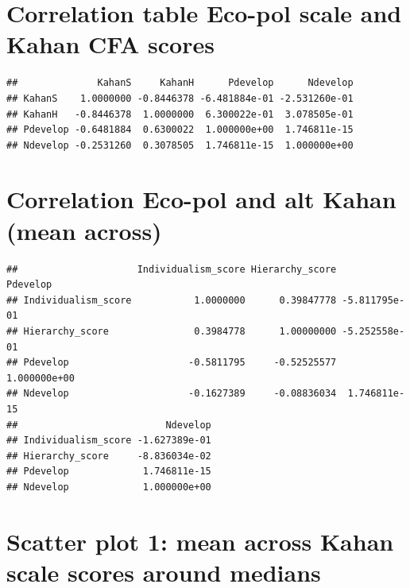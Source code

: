 \documentclass[
]{article}
\begin{document}
\newpage

\hypertarget{correlation-table-eco-pol-scale-and-kahan-cfa-scores}{%
\section{Correlation table Eco-pol scale and Kahan CFA
scores}\label{correlation-table-eco-pol-scale-and-kahan-cfa-scores}}

\begin{verbatim}
##              KahanS     KahanH      Pdevelop      Ndevelop
## KahanS    1.0000000 -0.8446378 -6.481884e-01 -2.531260e-01
## KahanH   -0.8446378  1.0000000  6.300022e-01  3.078505e-01
## Pdevelop -0.6481884  0.6300022  1.000000e+00  1.746811e-15
## Ndevelop -0.2531260  0.3078505  1.746811e-15  1.000000e+00
\end{verbatim}

\hypertarget{correlation-eco-pol-and-alt-kahan-mean-across}{%
\section{Correlation Eco-pol and alt Kahan (mean
across)}\label{correlation-eco-pol-and-alt-kahan-mean-across}}

\begin{verbatim}
##                     Individualism_score Hierarchy_score      Pdevelop
## Individualism_score           1.0000000      0.39847778 -5.811795e-01
## Hierarchy_score               0.3984778      1.00000000 -5.252558e-01
## Pdevelop                     -0.5811795     -0.52525577  1.000000e+00
## Ndevelop                     -0.1627389     -0.08836034  1.746811e-15
##                          Ndevelop
## Individualism_score -1.627389e-01
## Hierarchy_score     -8.836034e-02
## Pdevelop             1.746811e-15
## Ndevelop             1.000000e+00
\end{verbatim}

\newpage

\hypertarget{scatter-plot-1-mean-across-kahan-scale-scores-around-medians}{%
\section{Scatter plot 1: mean across Kahan scale scores around
medians}\label{scatter-plot-1-mean-across-kahan-scale-scores-around-medians}}
\end{document}
